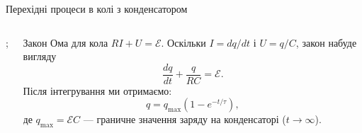 \documentclass[onlytextwidth]{beamer}
\begin{document}
\begin{frame}{Перехідні процеси в колі з конденсатором}{}
\begin{onlyenv}
\begin{columns}
\begin{column}{0.3\linewidth}
\begin{circuitikz}[european, scale=0.7, transform shape]
					;
				\end{circuitikz}
			\end{column}
			\begin{column}{0.7\linewidth}
				\begin{block}{}
					Закон Ома для кола $RI + U = \mathcal{E}$. Оскільки $I = dq/dt$ і $U= q/C$, закон набуде вигляду
					\begin{equation*}
						\frac{dq}{dt}  + \frac{q}{RC} =  \mathcal{E}.
					\end{equation*}
					Після інтегрування ми отримаємо:
					\begin{equation*}
						q =  q_{\max}(1 - e^{- t / \tau}),
					\end{equation*}
					де $q_{\max} = \mathcal{E} C$ --- граничне значення заряду на конденсаторі ($t \to \infty$).
				\end{block}
			\end{column}
		\end{columns}
	\end{onlyenv}
\end{frame}
\end{document}
